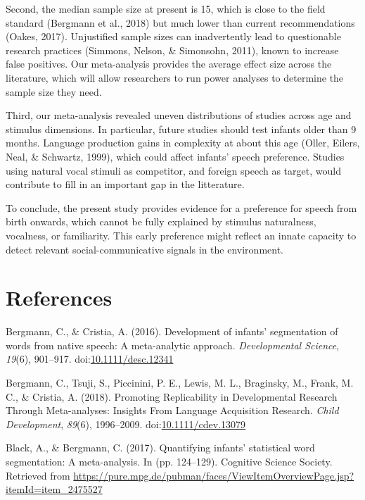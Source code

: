 \documentclass[man]{apa6}
\begin{document}
Second, the median sample size at present is 15, which is close to the
field standard (Bergmann et al., 2018) but much lower than current
recommendations (Oakes, 2017). Unjustified sample sizes can
inadvertently lead to questionable research practices (Simmons, Nelson,
\& Simonsohn, 2011), known to increase false positives. Our
meta-analysis provides the average effect size across the literature,
which will allow researchers to run power analyses to determine the
sample size they need.

Third, our meta-analysis revealed uneven distributions of studies across
age and stimulus dimensions. In particular, future studies should test
infants older than 9 months. Language production gains in complexity at
about this age (Oller, Eilers, Neal, \& Schwartz, 1999), which could
affect infants' speech preference. Studies using natural vocal stimuli
as competitor, and foreign speech as target, would contribute to fill in
an important gap in the litterature.

To conclude, the present study provides evidence for a preference for
speech from birth onwards, which cannot be fully explained by stimulus
naturalness, vocalness, or familiarity. This early preference might
reflect an innate capacity to detect relevant social-communicative
signals in the environment.

\newpage

\section{References}\label{references}

\begingroup
\setlength{\parindent}{-0.5in} \setlength{\leftskip}{0.5in}

\hypertarget{refs}{}
\hypertarget{ref-bergmann_development_2016}{}
Bergmann, C., \& Cristia, A. (2016). Development of infants'
segmentation of words from native speech: A meta-analytic approach.
\emph{Developmental Science}, \emph{19}(6), 901--917.
doi:\href{https://doi.org/10.1111/desc.12341}{10.1111/desc.12341}

\hypertarget{ref-bergmann_promoting_2018}{}
Bergmann, C., Tsuji, S., Piccinini, P. E., Lewis, M. L., Braginsky, M.,
Frank, M. C., \& Cristia, A. (2018). Promoting Replicability in
Developmental Research Through Meta-analyses: Insights From Language
Acquisition Research. \emph{Child Development}, \emph{89}(6),
1996--2009.
doi:\href{https://doi.org/10.1111/cdev.13079}{10.1111/cdev.13079}

\hypertarget{ref-black_quantifying_2017}{}
Black, A., \& Bergmann, C. (2017). Quantifying infants' statistical word
segmentation: A meta-analysis. In (pp. 124--129). Cognitive Science
Society. Retrieved from
\url{https://pure.mpg.de/pubman/faces/ViewItemOverviewPage.jsp?itemId=item_2475527}
\end{document}
